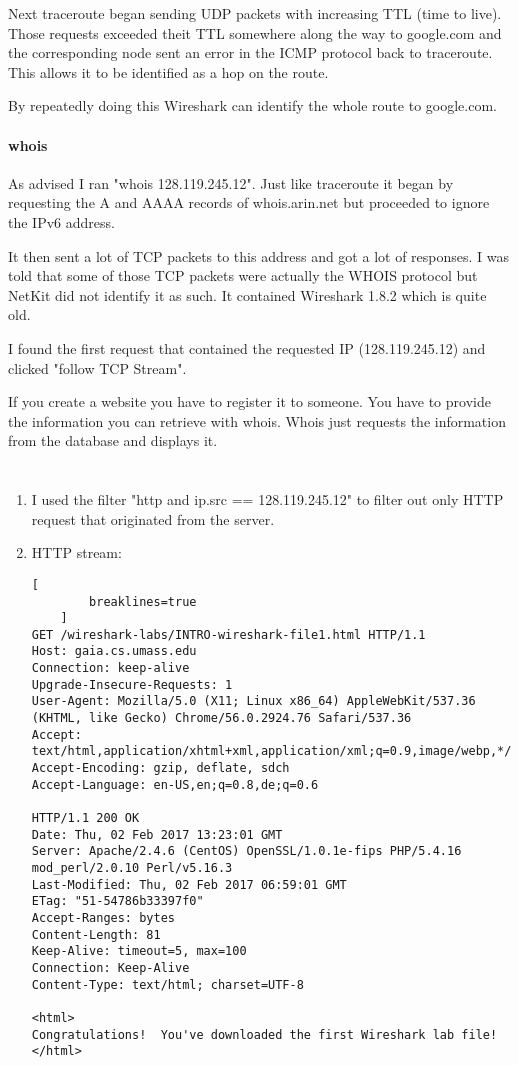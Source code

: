 \documentclass[12pt, a4paper]{article}
\begin{document}
\begin{enumerate}[a]
	Next traceroute began sending UDP packets with increasing TTL (time to live). Those requests exceeded theit TTL somewhere along the way to google.com and the corresponding node sent an error in the ICMP protocol back to traceroute. This allows it to be identified as a hop on the route.

	By repeatedly doing this Wireshark can identify the whole route to google.com.

	\paragraph{whois}
	As advised I ran "whois 128.119.245.12". Just like traceroute it began by requesting the A and AAAA records of whois.arin.net but proceeded to ignore the IPv6 address.

	It then sent a lot of TCP packets to this address and got a lot of responses. I was told that some of those TCP packets were actually the WHOIS protocol but NetKit did not identify it as such. It contained Wireshark 1.8.2 which is quite old.

	I found the first request that contained the requested IP (128.119.245.12) and clicked "follow TCP Stream".

	If you create a website you have to register it to someone. You have to provide the information you can retrieve with whois. Whois just requests the information from the database and displays it.
\end{enumerate}

\section{} %
\begin{enumerate}[a]
	\item %
	I used the filter "http and ip.src == 128.119.245.12" to filter out only HTTP request that originated from the server.

	\item %
	HTTP stream:

	\begin{lstlisting}[
		breaklines=true
	]
GET /wireshark-labs/INTRO-wireshark-file1.html HTTP/1.1
Host: gaia.cs.umass.edu
Connection: keep-alive
Upgrade-Insecure-Requests: 1
User-Agent: Mozilla/5.0 (X11; Linux x86_64) AppleWebKit/537.36 (KHTML, like Gecko) Chrome/56.0.2924.76 Safari/537.36
Accept: text/html,application/xhtml+xml,application/xml;q=0.9,image/webp,*/*;q=0.8
Accept-Encoding: gzip, deflate, sdch
Accept-Language: en-US,en;q=0.8,de;q=0.6

HTTP/1.1 200 OK
Date: Thu, 02 Feb 2017 13:23:01 GMT
Server: Apache/2.4.6 (CentOS) OpenSSL/1.0.1e-fips PHP/5.4.16 mod_perl/2.0.10 Perl/v5.16.3
Last-Modified: Thu, 02 Feb 2017 06:59:01 GMT
ETag: "51-54786b33397f0"
Accept-Ranges: bytes
Content-Length: 81
Keep-Alive: timeout=5, max=100
Connection: Keep-Alive
Content-Type: text/html; charset=UTF-8

<html>
Congratulations!  You've downloaded the first Wireshark lab file!
</html>
	\end{lstlisting}
\end{enumerate}
\end{document}
